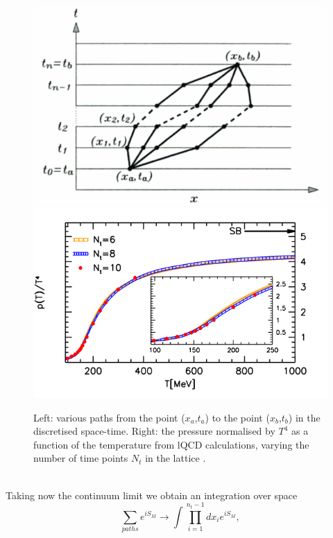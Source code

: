 \documentclass[b5paper,10pt,twoside,oldstyle,classica]{toptesi}
\begin{document}
\begin{figure}[htb]
\begin{center}
\includegraphics[scale = 0.24]{path.png}
\hspace{-0.2cm}
{\includegraphics[scale = 0.32]{figures_eos_p.png}}
\caption{Left: various paths from the point ($x_a$,$t_a$) to the point ($x_b$,$t_b$) in the discretised space-time. Right: the pressure normalised by $T^4$ as a function of the temperature from lQCD calculations, varying the number of time points $N_t$ in the lattice \cite{Borsanyi:2010cj}.}
\label{lattice_fig}
\end{center}
\end{figure}\\
Taking now the continuum limit we obtain an integration over space
\begin{equation}
 \sum_{paths} e^{iS_M} \rightarrow \int \prod_{i=1}^{n_t-1} dx_i e^{iS_M},
 \label{continuum}
\end{equation}
\end{document}
